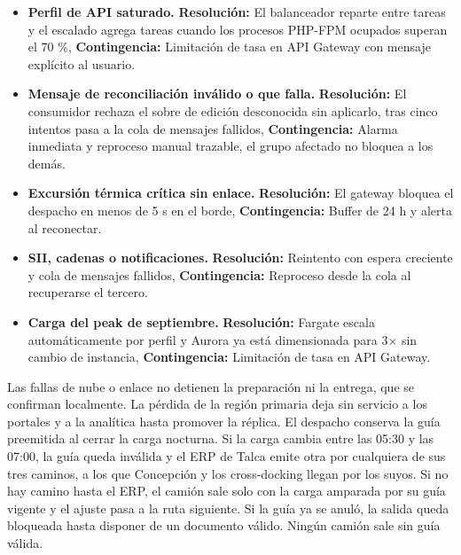 \begin{itemize}
\item \textbf{Perfil de API saturado.} \textbf{Resolución:} El balanceador reparte entre tareas y el escalado agrega tareas cuando los procesos PHP-FPM ocupados superan el 70 \%, \textbf{Contingencia:} Limitación de tasa en API Gateway con mensaje explícito al usuario.
\item \textbf{Mensaje de reconciliación inválido o que falla.} \textbf{Resolución:} El consumidor rechaza el sobre de edición desconocida sin aplicarlo, tras cinco intentos pasa a la cola de mensajes fallidos, \textbf{Contingencia:} Alarma inmediata y reproceso manual trazable, el grupo afectado no bloquea a los demás.
\item \textbf{Excursión térmica crítica sin enlace.} \textbf{Resolución:} El gateway bloquea el despacho en menos de 5 s en el borde, \textbf{Contingencia:} Buffer de 24 h y alerta al reconectar.
\item \textbf{SII, cadenas o notificaciones.} \textbf{Resolución:} Reintento con espera creciente y cola de mensajes fallidos, \textbf{Contingencia:} Reproceso desde la cola al recuperarse el tercero.
\item \textbf{Carga del peak de septiembre.} \textbf{Resolución:} Fargate escala automáticamente por perfil y Aurora ya está dimensionada para 3$\times$ sin cambio de instancia, \textbf{Contingencia:} Limitación de tasa en API Gateway.
\end{itemize}


Las fallas de nube o enlace no detienen la preparación ni la entrega, que se confirman localmente. La pérdida de la región primaria deja sin servicio a los portales y a la analítica hasta promover la réplica. El despacho conserva la guía preemitida al cerrar la carga nocturna. Si la carga cambia entre las 05:30 y las 07:00, la guía queda inválida y el ERP de Talca emite otra por cualquiera de sus tres caminos, a los que Concepción y los cross-docking llegan por los suyos. Si no hay camino hasta el ERP, el camión sale solo con la carga amparada por su guía vigente y el ajuste pasa a la ruta siguiente. Si la guía ya se anuló, la salida queda bloqueada hasta disponer de un documento válido. Ningún camión sale sin guía válida.

\label{fuente-02-c-conexiones-fin}
